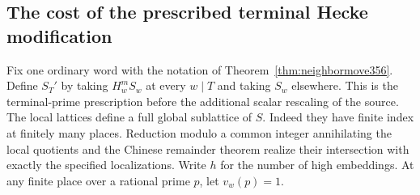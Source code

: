 \documentclass[a4paper,11pt]{article}
\theoremstyle{definition}
\theoremstyle{remark}
\numberwithin{equation}{section}
\begin{document}
\subsection{The cost of the prescribed terminal Hecke modification}
\label{sec:neighbornorm356}

Fix one ordinary word with the notation of
Theorem~\ref{thm:neighbormove356}. Define \(S_T'\) by taking
\(H_w^mS_w\) at every \(w\mid T\) and taking \(S_w\) elsewhere.
This is the terminal-prime prescription before the additional
scalar rescaling of the source. The local lattices define a
full global sublattice of \(S\). Indeed they have finite
index at finitely many places. Reduction modulo a common
integer annihilating the local quotients and the Chinese
remainder theorem realize their intersection with exactly
the specified localizations. Write \(h\) for the number of
high embeddings. At any finite place over a rational prime
\(p\), let \(v_w(p)=1\).
\end{document}
